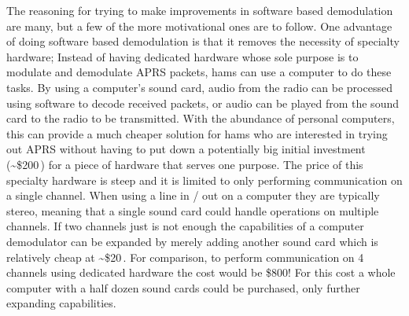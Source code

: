 The reasoning for trying to make improvements in software based demodulation are many, but a few of the more motivational ones are to follow. One advantage of doing software based demodulation is that it removes the necessity of specialty hardware; Instead of having dedicated hardware whose sole purpose is to modulate and demodulate APRS packets, hams can use a computer to do these tasks. By using a computer's sound card, audio from the radio can be processed using software to decode received packets, or audio can be played from the sound card to the radio to be transmitted. With the abundance of personal computers, this can provide a much cheaper solution for hams who are interested in trying out APRS without having to put down a potentially big initial investment (\textasciitilde\$200\,\cite{Kantronics2014,Outlet2014}) for a piece of hardware that serves one purpose. The price of this specialty hardware is steep and it is limited to only performing communication on a single channel. When using a line in / out on a computer they are typically stereo, meaning that a single sound card could handle operations on multiple channels. If two channels just is not enough the capabilities of a computer demodulator can be expanded by merely adding another sound card which is relatively cheap at \textasciitilde\$20\,\cite{Newegg}. For comparison, to perform communication on 4 channels using dedicated hardware the cost would be \$800! For this cost a whole computer with a half dozen sound cards could be purchased, only further expanding capabilities.


